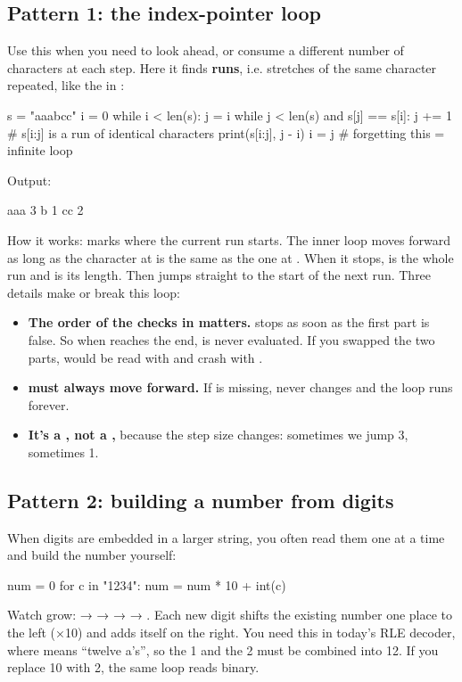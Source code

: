 \documentclass[10pt,a4paper]{article}
\begin{document}
\subsection{Pattern 1: the index-pointer loop}
Use this when you need to look ahead, or consume a different number of characters at each step. Here it finds \textbf{runs}, i.e. stretches of the same character repeated, like the  in :
\begin{pycode}
s = "aaabcc"
i = 0
while i < len(s):
    j = i
    while j < len(s) and s[j] == s[i]:
        j += 1
    # s[i:j] is a run of identical characters
    print(s[i:j], j - i)
    i = j          # forgetting this = infinite loop
\end{pycode}
Output:
\begin{txtcode}
aaa 3
b 1
cc 2
\end{txtcode}
How it works:  marks where the current run starts. The inner loop moves  forward as long as the character at  is the same as the one at . When it stops,  is the whole run and  is its length. Then  jumps straight to the start of the next run.
Three details make or break this loop:
\begin{itemize}
\item \textbf{The order of the checks in  matters.}  stops as soon as the first part is false. So when  reaches the end,  is never evaluated. If you swapped the two parts,  would be read with  and crash with .
\item \textbf{ must always move forward.} If  is missing,  never changes and the loop runs forever.
\item \textbf{It’s a , not a ,} because the step size changes: sometimes we jump 3, sometimes 1.
\end{itemize}
\subsection{Pattern 2: building a number from digits}
When digits are embedded in a larger string, you often read them one at a time and build the number yourself:
\begin{pycode}
num = 0
for c in "1234":
    num = num * 10 + int(c)
\end{pycode}
Watch  grow:  →  →  →  → . Each new digit shifts the existing number one place to the left (×10) and adds itself on the right. You need this in today’s RLE decoder, where  means “twelve a’s”, so the 1 and the 2 must be combined into 12. If you replace 10 with 2, the same loop reads binary.
\end{document}
